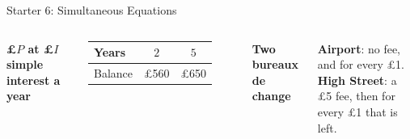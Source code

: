 \documentclass{beamer}
\newcommand{\receipt}[4]{%
  \draw[fill=yellow!4, draw=black!60]
    (#1,0) -- ({#1+1.95},0) -- ({#1+1.95},-1.3)
    \foreach \i in {1,...,6} { -- ({#1+1.95-0.325*\i+0.1625},-1.38) -- ({#1+1.95-0.325*\i},-1.3) }
    -- cycle;
  \node[anchor=west] at ({#1+0.1},-0.25) {#2};
  \node[anchor=west] at ({#1+0.1},-0.58) {#3};
  \draw[black!50, dashed] ({#1+0.1},-0.8) -- ({#1+1.85},-0.8);
  \node[anchor=west, font=\scriptsize\bfseries] at ({#1+0.1},-1.05) {Total};
  \node[anchor=east] at ({#1+1.85},-1.05) {#4};
}
\begin{document}
\begin{frame}[t]{Starter 6: Simultaneous Equations}
\begin{columns}[T,onlytextwidth]

\vspace{-0.4em}

\vspace{0.8em}
{\scriptsize\bfseries \pounds$P$ at \pounds$I$ simple interest a year}\par
\vspace{0.2em}
{\scriptsize
\renewcommand{\arraystretch}{1.3}
\begin{tabular}{l|c|c}
  Years   & $2$        & $5$\\ \hline
  Balance & \pounds560 & \pounds650
\end{tabular}}

\vspace{0.9em}
{\scriptsize\bfseries Two bureaux de change}\par
\vspace{0.2em}
\parbox{\linewidth}{\raggedright\scriptsize
  \textbf{Airport}: no fee, and  for every \pounds1.\\[2pt]
  \textbf{High Street}: a \pounds5 fee, then  for every \pounds1 that is left.}


\end{columns}
\end{frame}
\end{document}
